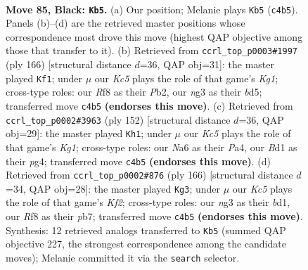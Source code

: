 \documentclass[11pt]{article}
\begin{document}
\clearpage

\begin{figure}[p]\centering
\begin{subfigure}{0.46\textwidth}\centering
\resizebox{\linewidth}{!}{%
\newchessgame
\chessboard[
  setfen={5r2/5p2/n5p1/4P2p/2k2Pp1/6N1/7P/1B1b2K1 b - - 29 85},
  showmover=false,
  pgfstyle=straightmove, color=movearrow, markmove={c4-b5}
]}
\caption{}
\end{subfigure}\hfill
\begin{subfigure}{0.46\textwidth}\centering
\resizebox{\linewidth}{!}{%
\newchessgame
\chessboard[
  setfen={8/8/3B4/1p1b2k1/1P3p1p/5P1P/1P4P1/6K1 w - - 38 84},
  showmover=false,
  pgfstyle=straightmove, color=movearrow, markmove={g1-f1}
]}
\caption{}
\end{subfigure}
\\[4pt]
\begin{subfigure}{0.46\textwidth}\centering
\resizebox{\linewidth}{!}{%
\newchessgame
\chessboard[
  setfen={B7/8/6k1/p1b2p2/P1P1p1p1/4P1P1/5P2/6K1 w - - 24 77},
  showmover=false,
  pgfstyle=straightmove, color=movearrow, markmove={g1-h1}
]}
\caption{}
\end{subfigure}\hfill
\begin{subfigure}{0.46\textwidth}\centering
\resizebox{\linewidth}{!}{%
\newchessgame
\chessboard[
  setfen={8/1p6/5pk1/6p1/4P1P1/2B2P2/1P3K2/3b4 w - - 30 84},
  showmover=false,
  pgfstyle=straightmove, color=movearrow, markmove={f2-g3}
]}
\caption{}
\end{subfigure}
\caption{\textbf{Move 85, Black: \texttt{Kb5}.} (a) Our position; Melanie plays \texttt{Kb5} (\texttt{c4b5}). Panels (b)--(d) are the retrieved master positions whose correspondence most drove this move (highest QAP objective among those that transfer to it). (b) Retrieved from \texttt{ccrl\_top\_p0003\#1997} (ply 166) [structural distance $d$=36, QAP obj=31]: the master played \texttt{Kf1}; under $\mu$ our \emph{Kc5} plays the role of that game's \emph{Kg1}; cross-type roles: our \emph{R}f8 as their \emph{P}b2, our \emph{n}g3 as their \emph{b}d5; transferred move \texttt{c4b5} \textbf{(endorses this move)}. (c) Retrieved from \texttt{ccrl\_top\_p0002\#3963} (ply 152) [structural distance $d$=36, QAP obj=29]: the master played \texttt{Kh1}; under $\mu$ our \emph{Kc5} plays the role of that game's \emph{Kg1}; cross-type roles: our \emph{N}a6 as their \emph{P}a4, our \emph{B}d1 as their \emph{p}g4; transferred move \texttt{c4b5} \textbf{(endorses this move)}. (d) Retrieved from \texttt{ccrl\_top\_p0002\#876} (ply 166) [structural distance $d$=34, QAP obj=28]: the master played \texttt{Kg3}; under $\mu$ our \emph{Kc5} plays the role of that game's \emph{Kf2}; cross-type roles: our \emph{n}g3 as their \emph{b}d1, our \emph{R}f8 as their \emph{p}b7; transferred move \texttt{c4b5} \textbf{(endorses this move)}. Synthesis: 12 retrieved analogs transferred to \texttt{Kb5} (summed QAP objective 227, the strongest correspondence among the candidate moves); Melanie committed it via the \texttt{search} selector.}
\label{fig:thought-m169}
\end{figure}
\end{document}
